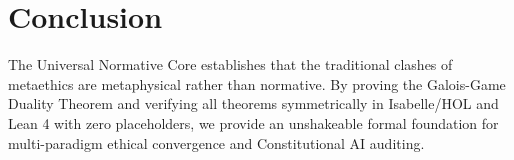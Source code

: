 \documentclass[runningheads]{llncs}
\begin{document}
\section{Conclusion}
The Universal Normative Core establishes that the traditional clashes of metaethics are metaphysical rather than normative. By proving the Galois-Game Duality Theorem and verifying all theorems symmetrically in Isabelle/HOL and Lean 4 with zero placeholders, we provide an unshakeable formal foundation for multi-paradigm ethical convergence and Constitutional AI auditing.



\end{document}
